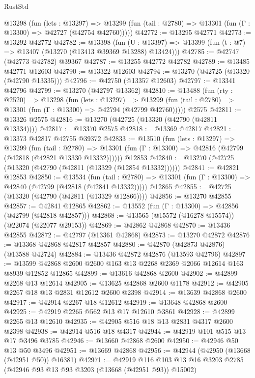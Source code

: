\begin{lexlean}{RustStd}
\begin{coremodule}
    @13298
      (fun (lets : @13297) =>
      @13299 (fun (tail : @2780) => @13301 (fun (Γ : @13300) => @42727 (@42754 @42760)))))
@42772 := @13295 @42771
@42773 := @13292 @42772
@42782 := @13398
    (fun (U : @13397) => @13399 (fun (t : @7) => @13407 (@13270 (@13413 @39369 @13288) @13424)))
@42785 := @42747 (@42773 @42782) @39367
@42787 := @13255 @42772 @42782
@42789 := @13485 @42771 @12603
@42790 := @13322 @12603
@42794 := @13270 (@42725 (@13320 (@42790 @13335)))
@42796 := @42750 (@13357 @12603)
@42797 := @13341 @42796
@42799 := @13270 (@42797 @13362)
@42810 := @13488
    (fun (rty : @2520) =>
    @13298
      (fun (lets : @13297) =>
      @13299 (fun (tail : @2780) => @13301 (fun (Γ : @13300) => @42794 (@42799 @42760)))))
    @2575
@42811 := @13326 @2575
@42816 := @13270 (@42725 (@13320 (@42790 (@42811 @13334))))
@42817 := @13370 @2575
@42818 := @13369 @42817
@42821 := @13373 @42817 @42755 @39372
@42833 := @13510
    (fun (lets : @13297) =>
    @13299
      (fun (tail : @2780) =>
      @13301 (fun (Γ : @13300) => @42816 (@42799 (@42818 (@42821 @13330 @13332))))))
    @12853
@42840 := @13270 (@42725 (@13320 (@42790 (@42811 (@13329 (@12854 @13332))))))
@42841 := @42821 @12853
@42850 := @13534
    (fun (tail : @2780) => @13301 (fun (Γ : @13300) => @42840 (@42799 (@42818 (@42841 @13332)))))
    @12865
@42855 := @42725 (@13320 (@42790 (@42811 (@13329 @12866))))
@42856 := @13270 @42855
@42857 := @42841 @12865
@42862 := @13552 (fun (Γ : @13300) => @42856 (@42799 (@42818 @42857)))
@42868 := @13565 (@15572 (@16278 @15574)) (@22074 (@22077 @29153))
@42869 := @42862 @42868
@42870 := @13436 @42855
@42872 := @42797 (@13361 @42868)
@42873 := @13270 @42872
@42876 := @13368 @42868 @42817 @42857
@42880 := @42870 (@42873 @42876) (@13588 @42724)
@42884 := @13436 @42872 @42876 (@13593 @42796)
@42897 := @13599 @42868 @2600 @2600 @163 @13 @2268 @2369 @2066 @12614 @163 @8939 @12852 @12865
@42899 := @13616 @42868 @2600
@42902 := @42899 @2268 @13 @12614
@42905 := @13625 @42868 @2600 @1178
@42912 := @42905 @2267 @18 @13 @2831 @12612 @2600 @2398
@42914 := @13639 @42868 @2600
@42917 := @42914 @2267 @18 @12612
@42919 := @13648 @42868 @2600
@42925 := @42919 @2265 @562 @13 @17 @12610 @3861
@42928 := @42899 @2265 @13 @12610
@42935 := @42905 @516 @18 @13 @2831 @4317 @2600 @2398
@42938 := @42914 @516 @18 @4317
@42944 := @42919 @101 @515 @13 @17 @3496 @3785
@42946 := @13660 @42868 @2600
@42950 := @42946 @50 @13 @50 @3496
@42951 := @13669 @42868
@42956 := @42944 (@42950 (@13668 (@42951 @50)) @16381)
@42971 := @42919
    @116
    @103
    @13
    @16
    @3203
    @2785
    (@42946 @93 @13 @93 @3203 (@13668 (@42951 @93)) @15002)

\end{coremodule}
\end{lexlean}
